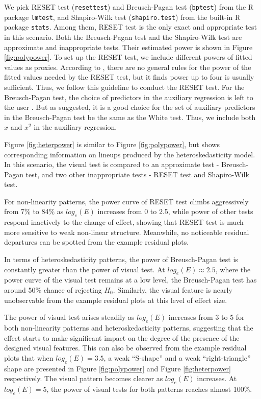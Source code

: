 \documentclass[]{interact}
\theoremstyle{plain}%
\theoremstyle{definition}
\theoremstyle{remark}
\begin{document}
We pick RESET test (\texttt{resettest}) and Breusch-Pagan test
(\texttt{bptest}) from the R package \texttt{lmtest}, and Shapiro-Wilk
test (\texttt{shapiro.test}) from the built-in R package \texttt{stats}.
Among them, RESET test is the only exact and appropriate test in this
scenario. Both the Breusch-Pagan test and the Shapiro-Wilk test are
approximate and inappropriate tests. Their estimated power is shown in
Figure \ref{fig:polypower}. To set up the RESET test, we include
different powers of fitted values as proxies. According to
\citet{ramsey_tests_1969}, there are no general rules for the power of
the fitted values needed by the RESET test, but it finds power up to
four is usually sufficient. Thus, we follow this guideline to conduct
the RESET test. For the Breusch-Pagan test, the choice of predictors in
the auxiliary regression is left to the user
\citep{breusch_simple_1979}. But as \citet{waldman1983note} suggested,
it is a good choice for the set of auxiliary predictors in the
Breusch-Pagan test be the same as the White test. Thus, we include both
\(x\) and \(x^2\) in the auxiliary regression.

Figure \ref{fig:heterpower} is similar to Figure \ref{fig:polypower},
but shows corresponding information on lineups produced by the
heteroskedasticity model. In this scenario, the visual test is compared
to an approximate test - Breusch-Pagan test, and two other inappropriate
tests - RESET test and Shapiro-Wilk test.

For non-linearity patterns, the power curve of RESET test climbs
aggressively from 7\% to 84\% as \(log_e(E)\) increases from 0 to 2.5,
while power of other tests respond inactively to the change of effect,
showing that RESET test is much more sensitive to weak non-linear
structure. Meanwhile, no noticeable residual departures can be spotted
from the example residual plots.

In terms of heteroskedasticity patterns, the power of Breusch-Pagan test
is constantly greater than the power of visual test. At
\(log_e(E) \approx 2.5\), where the power curve of the visual test
remains at a low level, the Breusch-Pagan test has around 50\% chance of
rejecting \(H_0\). Similarly, the visual feature is nearly unobservable
from the example residual plots at this level of effect size.

The power of visual test arises steadily as \(log_e(E)\) increases from
3 to 5 for both non-linearity patterns and heteroskedasticity patterns,
suggesting that the effect starts to make significant impact on the
degree of the presence of the designed visual features. This can also be
observed from the example residual plots that when \(log_e(E) = 3.5\), a
weak ``S-shape'' and a weak ``right-triangle'' shape are presented in
Figure \ref{fig:polypower} and Figure \ref{fig:heterpower} respectively.
The visual pattern becomes clearer as \(log_e(E)\) increases. At
\(log_e(E) = 5\), the power of visual tests for both patterns reaches
almost 100\%.
\end{document}
